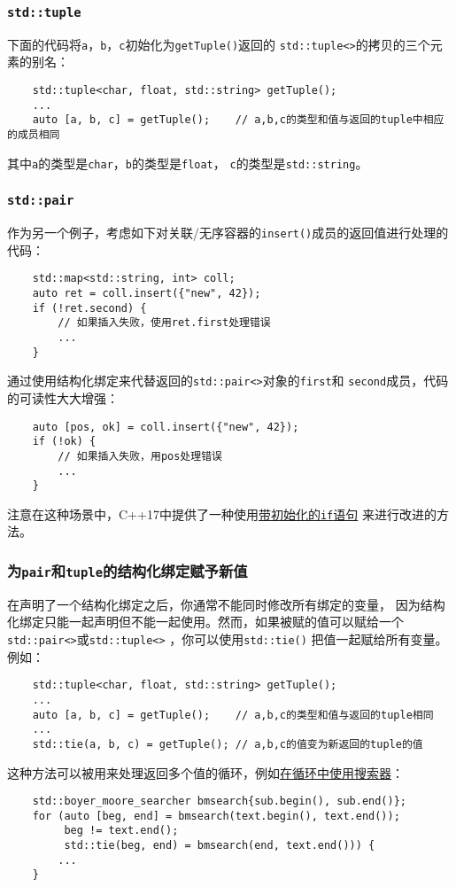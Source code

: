 \subsubsection{\texttt{std::tuple}}
下面的代码将\texttt{a}，\texttt{b}，\texttt{c}初始化为\texttt{getTuple()}返回的
\texttt{std::tuple<>}的拷贝的三个元素的别名：
\begin{lstlisting}
    std::tuple<char, float, std::string> getTuple();
    ...
    auto [a, b, c] = getTuple();    // a,b,c的类型和值与返回的tuple中相应的成员相同
\end{lstlisting}
其中\texttt{a}的类型是\texttt{char}，\texttt{b}的类型是\texttt{float}，
\texttt{c}的类型是\texttt{std::string}。

\subsubsection{\texttt{std::pair}}
作为另一个例子，考虑如下对关联/无序容器的\texttt{insert()}成员的返回值进行处理的代码：
\begin{lstlisting}
    std::map<std::string, int> coll;
    auto ret = coll.insert({"new", 42});
    if (!ret.second) {
        // 如果插入失败，使用ret.first处理错误
        ...
    }
\end{lstlisting}
通过使用结构化绑定来代替返回的\texttt{std::pair<>}对象的\texttt{first}和
\texttt{second}成员，代码的可读性大大增强：
\begin{lstlisting}
    auto [pos, ok] = coll.insert({"new", 42});
    if (!ok) {
        // 如果插入失败，用pos处理错误
        ...
    }
\end{lstlisting}
注意在这种场景中，C++17中提供了一种使用\hyperref[ch2]{带初始化的\texttt{if}语句}
来进行改进的方法。

\subsubsection{为\texttt{pair}和\texttt{tuple}的结构化绑定赋予新值}\label{ch1.2.3.4}
在声明了一个结构化绑定之后，你通常不能同时修改所有绑定的变量，
因为结构化绑定只能一起声明但不能一起使用。然而，如果被赋的值可以赋给一个\texttt{std::pair<>}或\texttt{std::tuple<>} ，你可以使用\texttt{std::tie()}
把值一起赋给所有变量。例如：
\begin{lstlisting}
    std::tuple<char, float, std::string> getTuple();
    ...
    auto [a, b, c] = getTuple();    // a,b,c的类型和值与返回的tuple相同
    ...
    std::tie(a, b, c) = getTuple(); // a,b,c的值变为新返回的tuple的值
\end{lstlisting}
这种方法可以被用来处理返回多个值的循环，例如\hyperref[ch24.1.2]{在循环中使用搜索器}：
\begin{lstlisting}
    std::boyer_moore_searcher bmsearch{sub.begin(), sub.end()};
    for (auto [beg, end] = bmsearch(text.begin(), text.end());
         beg != text.end();
         std::tie(beg, end) = bmsearch(end, text.end())) {
        ...
    }
\end{lstlisting}

